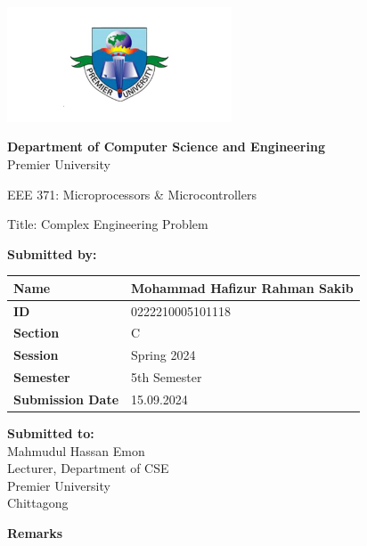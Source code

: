 \documentclass{scrreprt}
\renewcommand{\arraystretch}{1.5}
\begin{document}
\begin{titlepage}
    \centering
    \includegraphics[width=0.5\textwidth]{./logo.png} 
    \vspace{1cm}

    \textbf{Department of Computer Science and Engineering}\\
    Premier University
    \vspace{1cm}

    \huge \textnormal{EEE 371: Microprocessors \& Microcontrollers }
    \vspace{1in} 

    \Large \textnormal{Title: Complex Engineering Problem}
    \vspace{0.5in} 

    \large
    \textbf{Submitted by:}
    \vspace{0.5cm}

    \renewcommand{\arraystretch}{1.5} 
    \begin{tabular}{|p{}|p{}|}
        \hline
        \textbf{Name} & Mohammad Hafizur Rahman Sakib \\
        \hline
        \textbf{ID} & 0222210005101118 \\
        \hline
        \textbf{Section} & C \\
        \hline
        \textbf{Session} & Spring 2024 \\
        \hline
        \textbf{Semester} & 5th Semester \\
        \hline
        \textbf{Submission Date} & 15.09.2024 \\
        \hline
    \end{tabular}
    \vspace{1cm}

    \begin{minipage}[t]{0.48\textwidth}
        \textbf{Submitted to:}\\
        Mahmudul Hassan Emon\\
        Lecturer, Department of CSE\\
        Premier University\\
        Chittagong
    \end{minipage}%
    \hfill
    \begin{minipage}[t]{0.48\textwidth}
        \raggedleft
        \textbf{Remarks}\\
        \vspace{0.5cm} %
    \end{minipage}

    \date{\today}
    \vfill
\end{titlepage}
\end{document}

